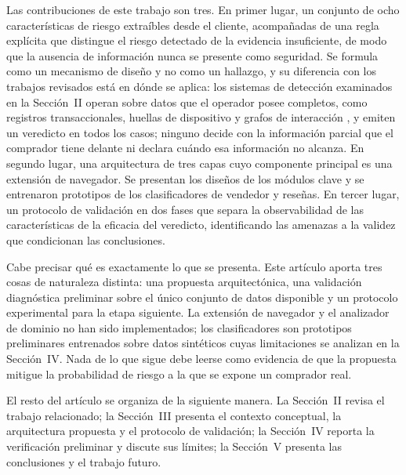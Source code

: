 Las contribuciones de este trabajo son tres. En primer lugar, un conjunto de ocho
características de riesgo extraíbles desde el cliente, acompañadas de una regla explícita que
distingue el riesgo detectado de la evidencia insuficiente, de modo que la ausencia de
información nunca se presente como seguridad. Se formula como un mecanismo de diseño y no como
un hallazgo, y su diferencia con los trabajos revisados está en dónde se aplica: los sistemas
de detección examinados en la Sección~II operan sobre datos que el operador posee completos,
como registros transaccionales, huellas de dispositivo y grafos de interacción \cite{ref28}, y
emiten un veredicto en todos los casos; ninguno decide con la información parcial que el
comprador tiene delante ni declara cuándo esa información no alcanza. En segundo lugar, una
arquitectura de tres capas cuyo componente principal es una extensión de navegador. Se
presentan los diseños de los módulos clave y se entrenaron prototipos de los clasificadores de
vendedor y reseñas. En tercer lugar, un protocolo de validación en dos fases que separa la
observabilidad de las características de la eficacia del veredicto, identificando las amenazas
a la validez que condicionan las conclusiones.

Cabe precisar qué es exactamente lo que se presenta. Este artículo aporta tres cosas de
naturaleza distinta: una propuesta arquitectónica, una validación diagnóstica preliminar sobre
el único conjunto de datos disponible y un protocolo experimental para la etapa siguiente. La
extensión de navegador y el analizador de dominio no han sido implementados; los clasificadores
son prototipos preliminares entrenados sobre datos sintéticos cuyas limitaciones se analizan en
la Sección~IV. Nada de lo que sigue debe leerse como evidencia de que la propuesta mitigue la
probabilidad de riesgo a la que se expone un comprador real.

El resto del artículo se organiza de la siguiente manera. La Sección~II revisa el trabajo
relacionado; la Sección~III presenta el contexto conceptual, la arquitectura propuesta y el
protocolo de validación; la Sección~IV reporta la verificación preliminar y discute sus
límites; la Sección~V presenta las conclusiones y el trabajo futuro.
